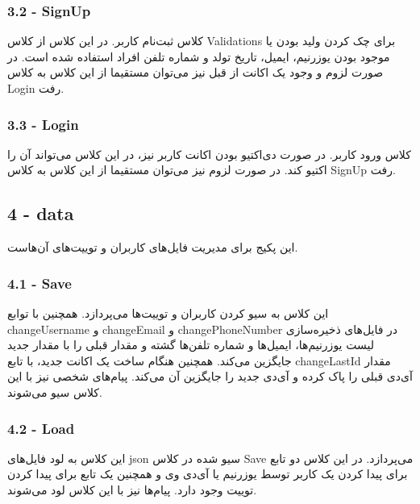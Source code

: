 \documentclass[12pt]{article}
\begin{document}
\LTR
\begin{latin}
\subsubsection*{3.2 - SignUp}
\end{latin}
\RTL
کلاس ثبت‌نام کاربر. در این کلاس از کلاس Validations برای چک کردن ولید بودن یا موجود بودن یوزرنیم، ایمیل، تاریخ تولد و شماره تلفن افراد استفاده شده است. در صورت لزوم و وجود یک اکانت از قبل نیز می‌توان مستقیما از این کلاس به کلاس Login رفت.

\LTR
\begin{latin}
\subsubsection*{3.3 - Login}
\end{latin}
\RTL
کلاس ورود کاربر. در صورت دی‌اکتیو بودن اکانت کاربر نیز، در این کلاس می‌تواند آن را اکتیو کند. در صورت لزوم نیز می‌توان مستقیما از این کلاس به کلاس SignUp رفت.

\LTR
\begin{latin}
\subsection*{4 - data}
\end{latin}
\RTL
این پکیج برای مدیریت فایل‌های کاربران و توییت‌های آن‌هاست.

\LTR
\begin{latin}
\subsubsection*{4.1 - Save}
\end{latin}
\RTL
این کلاس به سیو کردن کاربران و توییت‌ها می‌پردازد. همچنین با توابع changeUsername و changeEmail و changePhoneNumber در فایل‌های ذخیره‌سازی لیست یوزرنیم‌ها، ایمیل‌ها و شماره تلفن‌ها گشته و مقدار قبلی را با مقدار جدید جایگزین می‌کند. همچنین هنگام ساخت یک اکانت جدید، با تابع changeLastId مقدار آی‌دی قبلی را پاک کرده و آی‌دی جدید را جایگزین آن می‌کند. پیام‌های شخصی نیز با این کلاس سیو می‌شوند.

\LTR
\begin{latin}
\subsubsection*{4.2 - Load}
\end{latin}
\RTL
این کلاس به لود فایل‌های json سیو شده در کلاس Save می‌پردازد. در این کلاس دو تابع برای پیدا کردن یک کاربر توسط یوزرنیم یا آی‌دی وی و همچنین یک تابع برای پیدا کردن توییت وجود دارد. پیام‌ها نیز با این کلاس لود می‌شوند.
\end{document}

